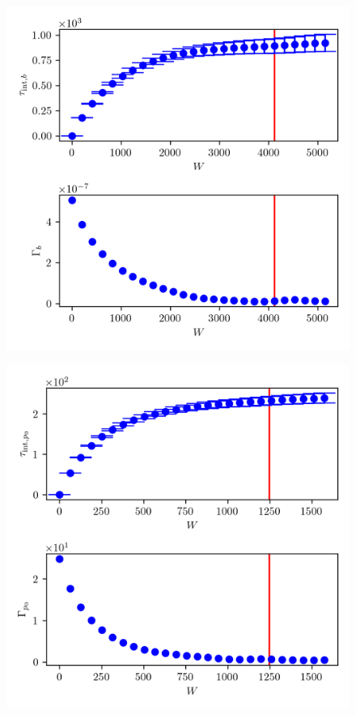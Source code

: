 \begin{figure}[ht!]
	\centering
	\includegraphics{UwerrTauIntTWalk14.png}
	\caption[]{}
	\label{fig:}
\end{figure}

\begin{figure}[ht!]
	\centering
	\includegraphics{UwerrTauIntTWalk15.png}
	\caption[]{}
	\label{fig:}
\end{figure}



